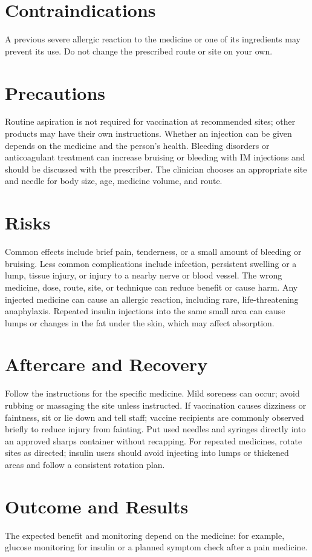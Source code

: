 \section*{Contraindications}
A previous severe allergic reaction to the medicine or one of its ingredients may prevent its use. Do not change the prescribed route or site on your own.

\section*{Precautions}
Routine aspiration is not required for vaccination at recommended sites; other products may have their own instructions. Whether an injection can be given depends on the medicine and the person's health. Bleeding disorders or anticoagulant treatment can increase bruising or bleeding with IM injections and should be discussed with the prescriber. The clinician chooses an appropriate site and needle for body size, age, medicine volume, and route.

\section*{Risks}
Common effects include brief pain, tenderness, or a small amount of bleeding or bruising. Less common complications include infection, persistent swelling or a lump, tissue injury, or injury to a nearby nerve or blood vessel. The wrong medicine, dose, route, site, or technique can reduce benefit or cause harm. Any injected medicine can cause an allergic reaction, including rare, life-threatening anaphylaxis. Repeated insulin injections into the same small area can cause lumps or changes in the fat under the skin, which may affect absorption.

\section*{Aftercare and Recovery}
Follow the instructions for the specific medicine. Mild soreness can occur; avoid rubbing or massaging the site unless instructed. If vaccination causes dizziness or faintness, sit or lie down and tell staff; vaccine recipients are commonly observed briefly to reduce injury from fainting. Put used needles and syringes directly into an approved sharps container without recapping. For repeated medicines, rotate sites as directed; insulin users should avoid injecting into lumps or thickened areas and follow a consistent rotation plan.

\section*{Outcome and Results}
The expected benefit and monitoring depend on the medicine: for example, glucose monitoring for insulin or a planned symptom check after a pain medicine.

